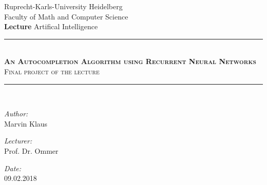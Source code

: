\documentclass[11pt,a4paper,bibliography=totocnumbered,listof=totocnumbered]{scrartcl}
\begin{document}
\begin{titlepage}

\newcommand{\HRule}{\rule{\linewidth}{0.5mm}} %

\center %

\LARGE Ruprecht-Karls-University Heidelberg \\[0.5cm] %
\Large Faculty of Math and Computer Science \\[1.5cm]
\Large \textbf{Lecture} Artifical Intelligence \\[0.5cm] %

\HRule \\[0.4cm]
{ \textsc{\huge \bfseries An Autocompletion Algorithm using Recurrent Neural Networks}}\\ \textsc{\Large Final project of the lecture }\\[0.4cm] %
\HRule \\[1.5cm]

\begin{minipage}{0.4\textwidth}
\begin{flushleft} \large
\emph{Author:}\\
Marvin Klaus \\%
\end{flushleft}

\begin{flushleft} \large
\emph{Lecturer:}\\
Prof. Dr. Ommer\\ %
\end{flushleft}

\begin{flushleft} \large
\emph{Date:}\\
09.02.2018 \\%
\end{flushleft}

\end{minipage}
~
\begin{minipage}{0.4\textwidth}
\end{minipage}\\[4cm]

\vfill %

\end{titlepage}

\end{document}

